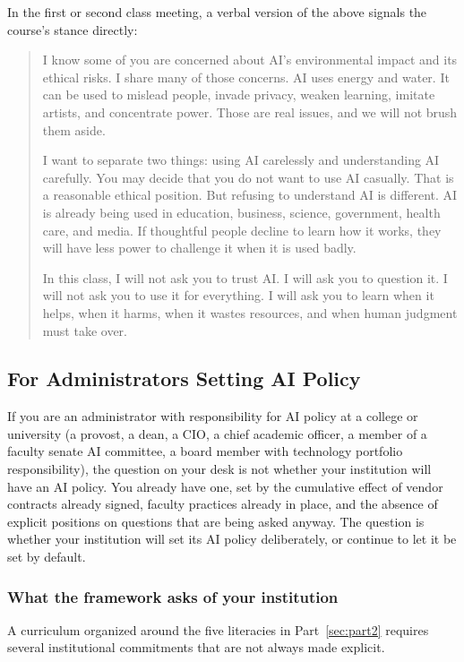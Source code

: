 \documentclass[12pt]{article}
\begin{document}
In the first or second class meeting, a verbal version of the above signals the course's stance directly:

\begin{quote}
I know some of you are concerned about AI's environmental impact and its ethical risks. I share many of those concerns. AI uses energy and water. It can be used to mislead people, invade privacy, weaken learning, imitate artists, and concentrate power. Those are real issues, and we will not brush them aside.

I want to separate two things: using AI carelessly and understanding AI carefully. You may decide that you do not want to use AI casually. That is a reasonable ethical position. But refusing to understand AI is different. AI is already being used in education, business, science, government, health care, and media. If thoughtful people decline to learn how it works, they will have less power to challenge it when it is used badly.

In this class, I will not ask you to trust AI. I will ask you to question it. I will not ask you to use it for everything. I will ask you to learn when it helps, when it harms, when it wastes resources, and when human judgment must take over.
\end{quote}

\subsection{For Administrators Setting AI Policy}
\label{sec:III.3}

If you are an administrator with responsibility for AI policy at a college or university (a provost, a dean, a CIO, a chief academic officer, a member of a faculty senate AI committee, a board member with technology portfolio responsibility), the question on your desk is not whether your institution will have an AI policy. You already have one, set by the cumulative effect of vendor contracts already signed, faculty practices already in place, and the absence of explicit positions on questions that are being asked anyway. The question is whether your institution will set its AI policy deliberately, or continue to let it be set by default.

\subsubsection*{What the framework asks of your institution}

A curriculum organized around the five literacies in Part~\ref{sec:part2} requires several institutional commitments that are not always made explicit.
\end{document}
